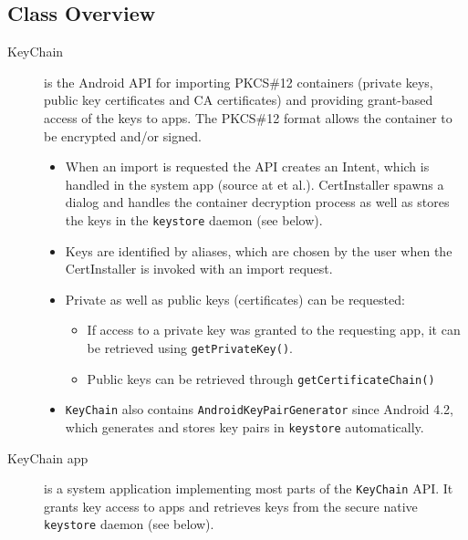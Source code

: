 \documentclass[a4paper]{scrartcl}
\begin{document}
	\subsection{Class Overview}
		\begin{description}
			\item[KeyChain] is the Android API for importing PKCS\#12 containers (private keys, public key certificates and CA certificates) and providing grant-based access of the keys to apps. The PKCS\#12 format allows the container to be encrypted and/or signed.
				\begin{itemize}
					\item When an import is requested the API creates an Intent, which is handled in the system app  (source at  et al.). CertInstaller spawns a dialog and handles the container decryption process as well as stores the keys in the \texttt{keystore} daemon (see below).
					\item Keys are identified by aliases, which are chosen by the user when the CertInstaller is invoked with an import request.
					\item Private as well as public keys (certificates) can be requested:
					\begin{itemize}
						\item If access to a private key was granted to the requesting app, it can be retrieved using \texttt{getPrivateKey()}.
						\item Public keys can be retrieved through \texttt{getCertificateChain()}
					\end{itemize}
				\item \texttt{KeyChain} also contains \texttt{AndroidKeyPairGenerator} since Android 4.2, which generates and stores key pairs in \texttt{key\-store} automatically.
				\end{itemize}

			\item[KeyChain app] is a system application implementing most parts of the \texttt{KeyChain} API. It grants key access to apps and retrieves keys from the secure native \texttt{keystore} daemon (see below).


\end{description}
\end{document}
